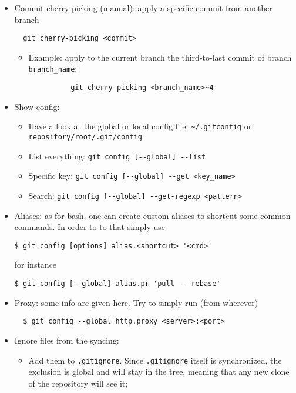 \documentclass[a4paper,12pt,%
              final%
              ]{article}
\begin{document}
\begin{itemize}
\begin{itemize}
    \end{itemize}
  \item Commit cherry-picking (\href{https://git-scm.com/docs/git-cherry-pick}{manual}): apply a specific commit from another branch
\begin{verbatim}
  git cherry-picking <commit>
\end{verbatim}
    \begin{itemize}
      \item Example: apply to the current branch the third-to-last commit of branch \verb|branch_name|:
        \begin{verbatim}
          git cherry-picking <branch_name>~4
        \end{verbatim}
    \end{itemize}
  \item Show config:
    \begin{itemize}
      \item Have a look at the global or local config file: \verb|~/.gitconfig| or \verb|repository/root/.git/config|
      \item List everything: \verb|git config [--global] --list|
      \item Specific key: \verb|git config [--global] --get <key_name>|
      \item Search: \verb|git config [--global] --get-regexp <pattern>|
    \end{itemize}
  \item Aliases: as for bash, one can create custom aliases to shortcut some common commands. In order to to that simply use
\begin{verbatim}
$ git config [options] alias.<shortcut> '<cmd>'
\end{verbatim}
        for instance
\begin{verbatim}
$ git config [--global] alias.pr 'pull ---rebase'
\end{verbatim}
  \item Proxy: some info are given \href{https://gist.github.com/evantoli/f8c23a37eb3558ab8765}{here}. Try to simply run (from wherever)
\begin{verbatim}
  $ git config --global http.proxy <server>:<port>
\end{verbatim}
  \item Ignore files from the syncing:
    \begin{itemize}
      \item Add them to \texttt{.gitignore}. Since \texttt{.gitignore} itself is synchronized, the exclusion is global and will stay in the tree, meaning that any new clone of the repository will see it;

\end{itemize}
\end{itemize}
\end{document}

